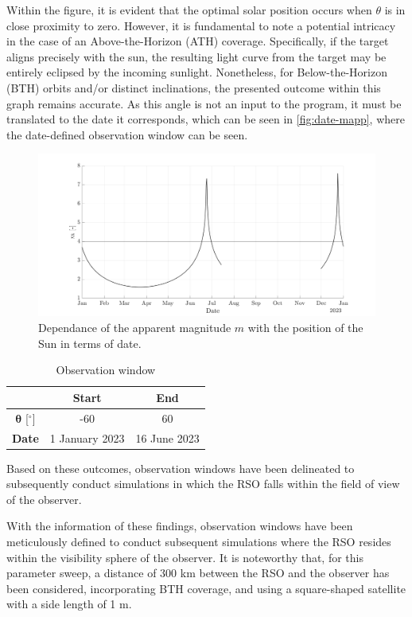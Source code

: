 Within the figure, it is evident that the optimal solar position occurs when $\theta$ is in close proximity to zero. However, it is fundamental to note a potential intricacy in the case of an Above-the-Horizon (ATH) coverage. Specifically, if the target aligns precisely with the sun, the resulting light curve from the target may be entirely eclipsed by the incoming sunlight. Nonetheless, for Below-the-Horizon (BTH) orbits and/or distinct inclinations, the presented outcome within this graph remains accurate. As this angle is not an input to the program, it must be translated to the date it corresponds, which can be seen in \autoref{fig:date-mapp}, where the date-defined observation window can be seen. 
\begin{figure}[H]
    \centering
    \includegraphics[width=\textwidth]{Figures/date-mapp.png}
    \caption{Dependance of the apparent magnitude $m$ with the position of the Sun in terms of date.}
    \label{fig:date-mapp}
\end{figure}

\begin{table}[H]
    \centering
    \caption{Observation window}
    \begin{tabular}{ccc}
    \toprule
     & \textbf{Start} & \textbf{End} \\
    \midrule
      $\boldsymbol{\theta}$ [$^\circ$]  & -60 & 60 \\
      \textbf{Date} & 1 January 2023 & 16 June 2023 \\
    \bottomrule
    \end{tabular}
    \label{tab:ventanas}
\end{table}

Based on these outcomes, observation windows have been delineated to subsequently conduct simulations in which the RSO falls within the field of view of the observer. 

With the information of these findings, observation windows have been meticulously defined to conduct subsequent simulations where the RSO resides within the visibility sphere of the observer. It is noteworthy that, for this parameter sweep, a distance of 300 km between the RSO and the observer has been considered, incorporating BTH coverage, and using a square-shaped satellite with a side length of 1 m.

